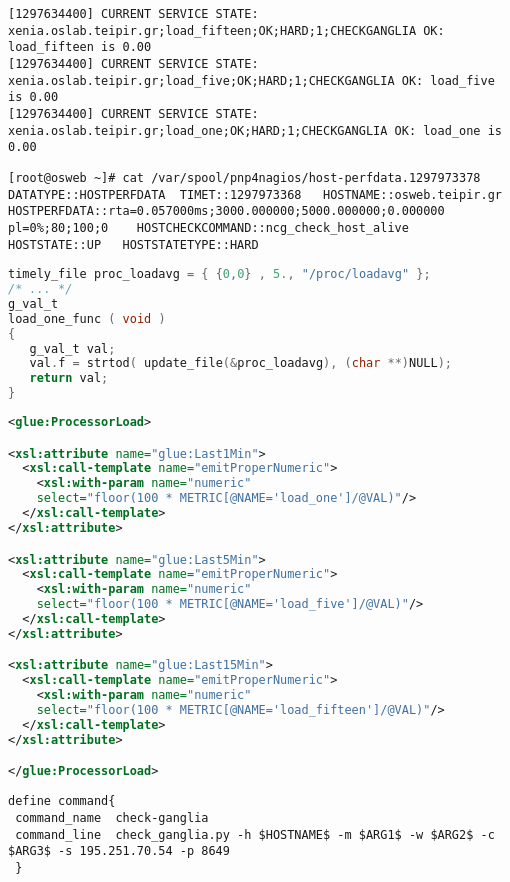 \begin{lstlisting}[caption=Nagios log with load check,label=nagioslog,nolol]
[1297634400] CURRENT SERVICE STATE: xenia.oslab.teipir.gr;load_fifteen;OK;HARD;1;CHECKGANGLIA OK: load_fifteen is 0.00
[1297634400] CURRENT SERVICE STATE: xenia.oslab.teipir.gr;load_five;OK;HARD;1;CHECKGANGLIA OK: load_five is 0.00
[1297634400] CURRENT SERVICE STATE: xenia.oslab.teipir.gr;load_one;OK;HARD;1;CHECKGANGLIA OK: load_one is 0.00
\end{lstlisting}

\begin{lstlisting}[caption=NPCD temporary file in spool directory,label=npcdfile]
[root@osweb ~]# cat /var/spool/pnp4nagios/host-perfdata.1297973378 
DATATYPE::HOSTPERFDATA	TIMET::1297973368	HOSTNAME::osweb.teipir.gr	HOSTPERFDATA::rta=0.057000ms;3000.000000;5000.000000;0.000000 pl=0%;80;100;0	HOSTCHECKCOMMAND::ncg_check_host_alive	HOSTSTATE::UP	HOSTSTATETYPE::HARD
\end{lstlisting}

\begin{lstlisting}[language=C,caption=libmetrics code to get load average,label=libmetrics]
timely_file proc_loadavg = { {0,0} , 5., "/proc/loadavg" };
/* ... */
g_val_t
load_one_func ( void )
{
   g_val_t val;
   val.f = strtod( update_file(&proc_loadavg), (char **)NULL);
   return val;
}
\end{lstlisting}

\begin{lstlisting}[language=XML,caption=WSRF XSLT for Ganglia Information Provider,label=xslt]
<glue:ProcessorLoad>

<xsl:attribute name="glue:Last1Min">
  <xsl:call-template name="emitProperNumeric">
    <xsl:with-param name="numeric" 
    select="floor(100 * METRIC[@NAME='load_one']/@VAL)"/>
  </xsl:call-template>
</xsl:attribute>

<xsl:attribute name="glue:Last5Min">
  <xsl:call-template name="emitProperNumeric">
    <xsl:with-param name="numeric" 
    select="floor(100 * METRIC[@NAME='load_five']/@VAL)"/>
  </xsl:call-template>
</xsl:attribute>

<xsl:attribute name="glue:Last15Min">
  <xsl:call-template name="emitProperNumeric">
    <xsl:with-param name="numeric" 
    select="floor(100 * METRIC[@NAME='load_fifteen']/@VAL)"/>
  </xsl:call-template>
</xsl:attribute>

</glue:ProcessorLoad>
\end{lstlisting}

\begin{lstlisting}[caption=Nagios configuration to check ganglia,label=checkganglia]
define command{
 command_name  check-ganglia
 command_line  check_ganglia.py -h $HOSTNAME$ -m $ARG1$ -w $ARG2$ -c $ARG3$ -s 195.251.70.54 -p 8649
 }
\end{lstlisting}

